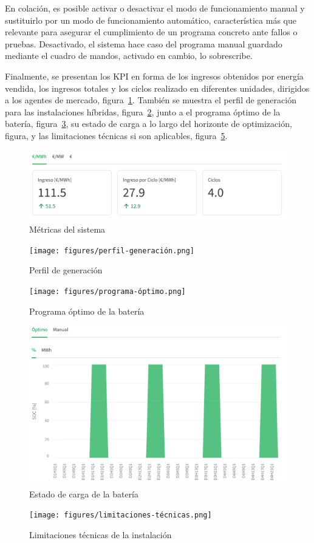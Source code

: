En colación, es posible activar o desactivar el modo de funcionamiento manual y sustituirlo por un modo de funcionamiento automático, característica más que relevante para asegurar el cumplimiento de un programa concreto ante fallos o pruebas. Desactivado, el sistema hace caso del programa manual guardado mediante el cuadro de mandos, activado en cambio, lo sobrescribe.

Finalmente, se presentan los KPI en forma de los ingresos obtenidos por energía vendida, los ingresos totales y los ciclos realizado en diferentes unidades, dirigidos a los agentes de mercado, figura~\ref{fig:kpi-sistema}. También se muestra el perfil de generación para las instalaciones híbridas, figura~\ref{fig:perfil-generación}, junto a el programa óptimo de la batería, figura~\ref{fig:programa-óptimo}, su estado de carga a lo largo del horizonte de optimización, figura, y las limitaciones técnicas si son aplicables, figura~\ref{fig:limitaciones-técnicas}.

\begin{figure}
\centering
\includegraphics[width=0.5\linewidth]{figures/kpi-sistema.png}
\caption{Métricas del sistema}
\label{fig:kpi-sistema}
\end{figure}

\begin{figure}
\centering
\texttt{[image: figures/perfil-generación.png]}
\caption{Perfil de generación}
\label{fig:perfil-generación}
\end{figure}

\begin{figure}
\centering
\texttt{[image: figures/programa-óptimo.png]}
\caption{Programa óptimo de la batería}
\label{fig:programa-óptimo}
\end{figure}

\begin{figure}
\centering
\includegraphics[width=0.5\linewidth]{figures/soc-bess.png}
\caption{Estado de carga de la batería}
\label{fig:soc-bess}
\end{figure}

\begin{figure}
\centering
\texttt{[image: figures/limitaciones-técnicas.png]}
\caption{Limitaciones técnicas de la instalación}
\label{fig:limitaciones-técnicas}
\end{figure}
